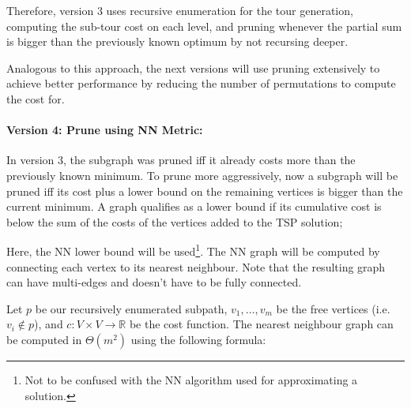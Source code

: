Therefore, version 3 uses recursive enumeration for the tour generation, computing the sub-tour cost on each level, and pruning whenever the partial sum is bigger than the previously known optimum by not recursing deeper.

Analogous to this approach, the next versions will use pruning extensively to achieve better performance by reducing the number of permutations to compute the cost for.

\paragraph{Version 4: Prune using \ac{NN} Metric:}

In version 3, the subgraph was pruned iff it already costs more than the previously known minimum. To prune more aggressively, now a subgraph will be pruned iff its cost plus a lower bound on the remaining vertices is bigger than the current minimum. A graph qualifies as a lower bound if its cumulative cost is below the sum of the costs of the vertices added to the \ac{TSP} solution;

Here, the \acl{NN} lower bound will be used\footnote{Not to be confused with the \acl{NN} algorithm used for approximating a solution.}. The \ac{NN} graph will be computed by connecting each vertex to its nearest neighbour. Note that the resulting graph can have multi-edges and doesn't have to be fully connected.

Let $p$ be our recursively enumerated subpath, $v_1,\dots,v_m$ be the free vertices (i.e. $v_i \not\in p$), and $c : V \times V \rightarrow \mathbb{R}$ be the cost function. The nearest neighbour graph can be computed in $\Theta(m^2)$ using the following formula:



